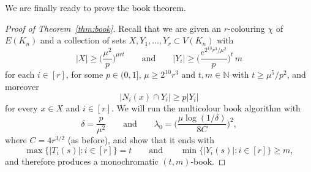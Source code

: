\documentclass[12pt,reqno]{amsart}
\theoremstyle{definition}
\theoremstyle{remark}
\newcommand\N{\mathbb{N}}
\renewcommand{\ge}{\geqslant}
\def\N{\mathbb{N}}
\begin{document}
We are finally ready to prove the book theorem. 

\begin{proof}[Proof of Theorem~\ref{thm:book}]
Recall that we are given an $r$-colouring $\chi$ of $E(K_n)$ and a collection of %
sets $X,Y_1,\ldots,Y_r \subset V(K_n)$ with
\begin{equation}\label{eq:book:thm:conditions}
|X| \ge \bigg( \frac{\mu^2}{p} \bigg)^{\mu r t} \qquad \text{and} \qquad |Y_i| \ge \bigg( \frac{e^{2^{13} r^3 / \mu^2}}{p} \bigg)^t \, m
\end{equation}
for each $i \in [r]$, for some $p \in (0,1]$, $\mu \ge 2^{10} r^3$ and $t,m \in \N$ with $t \ge \mu^5 / p^2$, and moreover
\begin{equation}\label{eq:book:thm:min:degree}
|N_i(x) \cap Y_i| \ge p|Y_i|
\end{equation}
for every $x \in X$ and $i \in [r]$. 
We will run the multicolour book algorithm with
\begin{equation}\label{def:delta:lambda0}
\delta = \frac{p}{\mu^2} \qquad \text{and} \qquad \lambda_0 = \bigg( \frac{\mu \log(1/\delta)}{8C} \bigg)^2,
\end{equation}
where $C = 4r^{3/2}$ (as before), and show that it ends with
$$\max \big\{ |T_i(s)| : i \in [r] \big\} = t \qquad \text{and} \qquad \min\big\{ |Y_i(s)| : i \in [r] \big\} \ge m,$$
and therefore produces a monochromatic $(t,m)$-book.


\end{proof}
\end{document}
